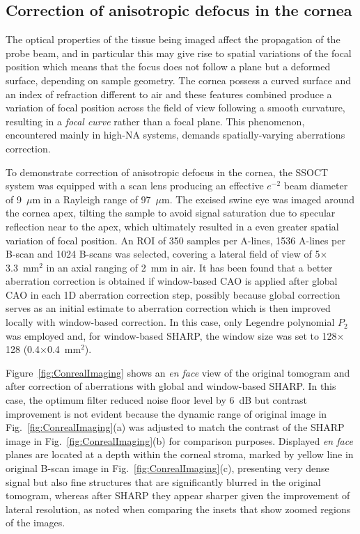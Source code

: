 \subsection{Correction of anisotropic defocus in the cornea}\label{sec:CorneaImaging}

The optical properties of the tissue being imaged affect the propagation of the probe beam, and in particular this may give rise to spatial variations of the focal position which means that the focus does not follow a plane but a deformed surface, depending on sample geometry. The cornea possess a curved surface and an index of refraction different to air and these features combined produce a variation of focal position across the field of view following a smooth curvature, resulting in a \textit{focal curve} rather than a focal plane. This phenomenon, encountered mainly in high-NA systems, demands spatially-varying aberrations correction.

To demonstrate correction of anisotropic defocus in the cornea, the SSOCT system was equipped with a scan lens producing an effective $e^{-2}$ beam diameter of 9~$\mu$m in a Rayleigh range of 97~$\mu$m. The excised swine eye was imaged around the cornea apex, tilting the sample to avoid signal saturation due to specular reflection near to the apex, which ultimately resulted in a even greater spatial variation of focal position. An ROI of 350 samples per A-lines, 1536 A-lines per B-scan and 1024 B-scans was selected, covering a lateral field of view of 5$\times$3.3~mm$^2$ in an axial ranging of 2~mm in air. It has been found that a better aberration correction is obtained if window-based CAO is applied after global CAO in each 1D aberration correction step, possibly because global correction serves as an initial estimate to aberration correction which is then improved locally with window-based correction. In this case, only Legendre polynomial $P_2$ was employed and, for window-based SHARP, the window size was set to 128$\times$128 (0.4$\times$0.4~mm$^2$).

Figure~\ref{fig:ConrealImaging} shows an \textit{en face} view of the original tomogram and after correction of aberrations with global and window-based SHARP. In this case, the optimum filter reduced noise floor level by 6~dB but contrast improvement is not evident because the dynamic range of original image in Fig.~\ref{fig:ConrealImaging}(a) was adjusted to match the contrast of the SHARP image in Fig.~\ref{fig:ConrealImaging}(b) for comparison purposes. Displayed \textit{en face} planes are located at a depth within the corneal stroma, marked by yellow line in original B-scan image in Fig.~\ref{fig:ConrealImaging}(c), presenting very dense signal but also fine structures that are significantly blurred in the original tomogram, whereas after SHARP they appear sharper given the improvement of lateral resolution, as noted when comparing the insets that show zoomed regions of the images.

